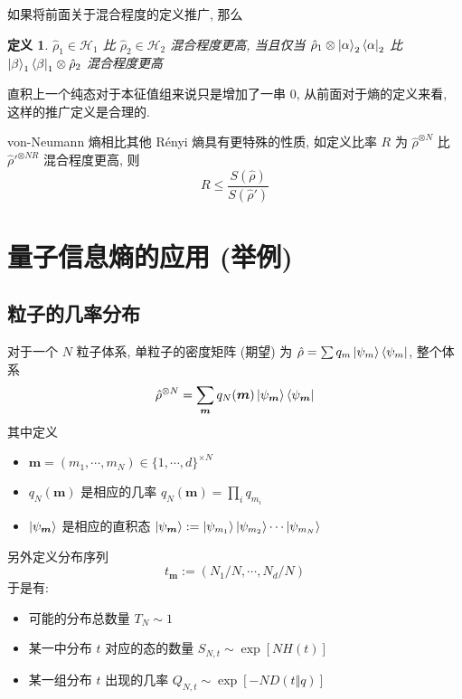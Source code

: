 \documentclass[12pt,a4paper]{article}
\renewcommand*{\vec}[1]{\bm{#1}}
\newtheorem{definition}{定义}
\begin{document}
    如果将前面关于混合程度的定义推广, 那么
    \begin{definition}
        $\hat\rho_1\in\mathcal H_1$ 比 $\hat\rho_2\in\mathcal H_2$ 混合程度更高, 
        当且仅当 $\hat\rho_1\otimes\ket\alpha_2\bra\alpha_2$ 比 
        $\ket\beta_1\bra\beta_1\otimes\hat\rho_2$ 混合程度更高
    \end{definition}
    直积上一个纯态对于本征值组来说只是增加了一串 $0$, 从前面对于熵的定义来看, 
    这样的推广定义是合理的.

    von-Neumann 熵相比其他 R\'enyi 熵具有更特殊的性质, 
    如定义比率 $R$ 为 $\hat\rho^{\otimes N}$ 
    比 $\hat\rho'^{\otimes NR}$ 混合程度更高, 则
    \begin{equation}
        R \le \frac{S(\hat\rho)}{S(\hat\rho')}
    \end{equation}

\section{量子信息熵的应用 (举例)} %
\label{sec:Quantum_info_entropy}
\subsection{粒子的几率分布}
    对于一个 $N$ 粒子体系, 
    单粒子的密度矩阵 (期望) 为 $\hat\rho = \sum q_m\ket{\psi_m}\bra{\psi_m}$, 
    整个体系
    \begin{equation}
        \hat\rho^{\otimes N} = \sum_{\vec m}q_N(\vec m)\ket{\psi_{\vec m}}\bra{\psi_{\vec m}}
    \end{equation}
    其中定义
    \begin{itemize}
        \item $\vec m = (m_1,\cdots, m_N)\in\{1,\cdots,d\}^{\times N}$
        \item $q_N(\vec m)$ 是相应的几率 $q_N(\vec m) = \prod_i q_{m_i}$ 
        \item $\ket{\psi_{\vec m}}$ 是相应的直积态 
        $\ket{\psi_{\vec m}} := \ket{\psi_{m_1}}\ket{\psi_{m_2}}\cdots\ket{\psi_{m_N}}$
    \end{itemize}

    另外定义分布序列
    \begin{equation}
        t_{\vec m}:=(N_1/N,\cdots,N_{d}/N)
    \end{equation}
    于是有:
    \begin{itemize}
        \item 可能的分布总数量 $T_N \sim 1$
        \item 某一中分布 $t$ 对应的态的数量 $S_{N,t} \sim \exp[N H(t)]$ 
        \item 某一组分布 $t$ 出现的几率 $Q_{N,t}\sim \exp[-ND(t\Vert q)]$
    \end{itemize}
\end{document}
